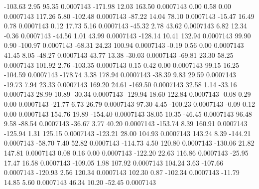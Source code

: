     -103.63        2.95       95.35     0.0007143
     -171.98       12.03      163.50     0.0007143
        0.00        0.58        0.00     0.0007143
      117.26        5.80     -102.48     0.0007143
      -87.22       14.04       78.10     0.0007143
      -15.47       16.49        0.78     0.0007143
        0.12       17.73        5.16     0.0007143
      -45.32        2.78       43.62     0.0007143
        6.82       12.34       -0.36     0.0007143
      -44.56        1.01       43.99     0.0007143
     -128.14       10.41      132.94     0.0007143
       99.90        0.90     -100.97     0.0007143
      -68.31       24.23      100.94     0.0007143
       -0.19        0.56        0.00     0.0007143
       41.45        8.05      -48.27     0.0007143
       43.77       13.38      -30.03     0.0007143
      -69.81       23.30       58.25     0.0007143
      101.92        2.76     -103.35     0.0007143
        0.15        0.42        0.00     0.0007143
       99.15       16.25     -104.59     0.0007143
     -178.74        3.38      178.94     0.0007143
      -38.39        9.83       29.59     0.0007143
      -19.73        7.94       23.33     0.0007143
      169.20       24.61     -169.50     0.0007143
       32.58        1.14      -33.16     0.0007143
       28.99       10.89      -30.34     0.0007143
     -129.94       18.60      122.84     0.0007143
       -0.08        0.29        0.00     0.0007143
      -21.77        6.73       26.79     0.0007143
       97.30        4.45     -100.23     0.0007143
       -0.09        0.12        0.00     0.0007143
      154.76       19.89     -154.40     0.0007143
       38.05       10.35      -46.45     0.0007143
       96.48        9.58      -88.54     0.0007143
      -36.67        3.77       40.20     0.0007143
     -153.74        8.39      160.91     0.0007143
     -125.94        1.31      125.15     0.0007143
     -123.21       28.00      104.93     0.0007143
      143.24        8.39     -144.21     0.0007143
      -58.70        7.40       52.82     0.0007143
     -114.73        4.50      120.80     0.0007143
     -130.06       21.82      147.81     0.0007143
        0.08        0.16        0.00     0.0007143
     -122.20       22.63      116.86     0.0007143
      -25.95       17.47       16.58     0.0007143
     -109.05        1.98      107.92     0.0007143
      104.24        3.63     -107.66     0.0007143
     -120.93        2.56      120.34     0.0007143
      102.30        0.87     -102.34     0.0007143
      -11.79       14.85        5.60     0.0007143
       46.34       10.20      -52.45     0.0007143

